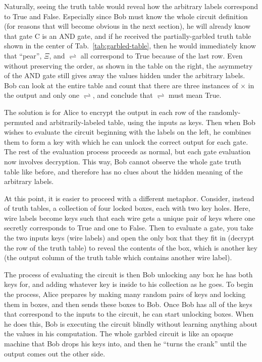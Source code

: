 Naturally, seeing the truth table would reveal how the arbitrary labels correspond to True and False. Especially since Bob must know the whole circuit definition (for reasons that will become obvious in the next section), he will already know that gate C is an AND gate, and if he received the partially-garbled truth table shown in the center of Tab.~\ref{tab:garbled-table}, then he would immediately know that ``pear'', $\Xi$, and $\rightleftharpoons$ all correspond to True because of the last row. Even without preserving the order, as shown in the table on the right, the asymmetry of the AND gate still gives away the values hidden under the arbitrary labels. Bob can look at the entire table and count that there are three instances of $\times$ in the output and only one $\rightleftharpoons$, and conclude that $\rightleftharpoons$ must mean True.

The solution is for Alice to encrypt the output in each row of the randomly-permuted and arbitrarily-labeled table, using the inputs as keys. Then when Bob wishes to evaluate the circuit beginning with the labels on the left, he combines them to form a key with which he can unlock the correct output for each gate. The rest of the evaluation process proceeds as normal, but each gate evaluation now involves decryption. This way, Bob cannot observe the whole gate truth table like before, and therefore has no clues about the hidden meaning of the arbitrary labels.

At this point, it is easier to proceed with a different metaphor. Consider, instead of truth tables, a collection of four locked boxes, each with two key holes. Here, wire labels become keys such that each wire gets a unique pair of keys where one secretly corresponds to True and one to False. Then to evaluate a gate, you take the two inputs keys (wire labels) and open the only box that they fit in (decrypt the row of the truth table) to reveal the contents of the box, which is another key (the output column of the truth table which contains another wire label).

The process of evaluating the circuit is then Bob unlocking any box he has both keys for, and adding whatever key is inside to his collection as he goes. To begin the process, Alice prepares by making many random pairs of keys and locking them in boxes, and then sends these boxes to Bob. Once Bob has all of the keys that correspond to the inputs to the circuit, he can start unlocking boxes. When he does this, Bob is executing the circuit blindly without learning anything about the values in his computation. The whole garbled circuit is like an opaque machine that Bob drops his keys into, and then he ``turns the crank'' until the output comes out the other side.

